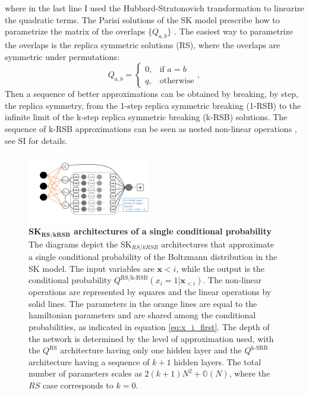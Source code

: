 \documentclass[aps,physrev,10pt,floatfix,reprint]{revtex4-2}
\begin{document}
where in the last line I used the Hubbard-Stratonovich transformation to linearize the quadratic terms. 
The Parisi solutions of the SK model prescribe how to parametrize the matrix of the overlaps $\{Q_{a,b}\}$ \cite{10.1142/0271}. The easiest way to parametrize the overlaps is the replica symmetric solutions (RS), where the overlaps are symmetric under permutations: 
$$
Q_{a,b}=\begin{cases}
			0, & \text{if $a=b$}\\
            q, & \text{otherwise}
		 \end{cases},
$$
Then a sequence of better approximations can be obtained by breaking, by step, the replica symmetry, from the 1-step replica symmetric breaking (1-RSB) to the infinite limit of the k-step replica symmetric breaking (k-RSB) solutions. 
The sequence of k-RSB approximations can be seen as nested non-linear operations \cite{Parisi_1980}, see SI for details. 
\begin{figure}[!h]
    \centering 
    \includegraphics[width=0.48\textwidth]{img/SK_arch.pdf}
    \caption{\textbf{SK$\mathbf{_{RS/kRSB}}$ architectures of a single conditional probability} The diagrams depict the SK$_{RS/kRSB}$ architectures that approximate a single conditional probability of the Boltzmann distribution in the SK model. The input variables are $\mathbf{x}{<i}$, while the output is the conditional probability $Q^{\text{RS/k-RSB}}\left(x_{i}=1|\mathbf{x}_{<i}\right)$. The non-linear operations are represented by squares and the linear operations by solid lines. The parameters in the orange lines are equal to the hamiltonian parameters and are shared among the conditional probabilities, as indicated in equation \ref{eq:x_i_first}. The depth of the network is determined by the level of approximation used, with the $Q^{\text{RS}}$ architecture having only one hidden layer and the $Q^{\text{k-SRB}}$ architecture having a sequence of $k+1$ hidden layers. The total number of parameters scales as $2(k+1)N^2 + \mathbb{O}(N)$, where the $RS$ case corresponds to $k=0$.}
    \label{fig:SK_arch}
\end{figure}
\end{document}
